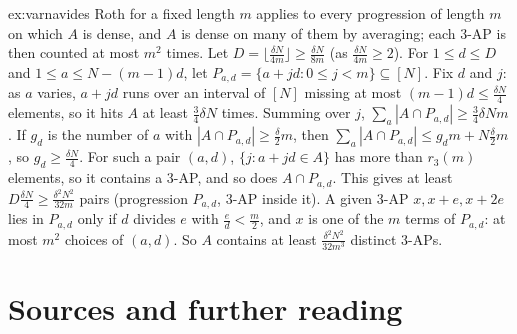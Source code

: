 \begin{solution}{ex:varnavides}
\idea Roth for a fixed length $m$ applies to every progression of length $m$ on which $A$ is dense, and $A$ is dense on many of them by averaging; each $3$-AP is then counted at most $m^2$ times.
\writeup Let $D=\lfloor\frac{\delta N}{4m}\rfloor\ge\frac{\delta N}{8m}$ (as $\frac{\delta N}{4m}\ge2$). For $1\le d\le D$ and $1\le a\le N-(m-1)d$, let $P_{a,d}=\{a+jd:0\le j<m\}\subseteq[N]$. Fix $d$ and $j$: as $a$ varies, $a+jd$ runs over an interval of $[N]$ missing at most $(m-1)d\le\frac{\delta N}4$ elements, so it hits $A$ at least $\frac34\delta N$ times. Summing over $j$, $\sum_a|A\cap P_{a,d}|\ge\frac34\delta Nm$. If $g_d$ is the number of $a$ with $|A\cap P_{a,d}|\ge\frac\delta2m$, then $\sum_a|A\cap P_{a,d}|\le g_dm+N\frac\delta2m$, so $g_d\ge\frac{\delta N}4$. For such a pair $(a,d)$, $\{j:a+jd\in A\}$ has more than $r_3(m)$ elements, so it contains a $3$-AP, and so does $A\cap P_{a,d}$. This gives at least $D\frac{\delta N}4\ge\frac{\delta^2N^2}{32m}$ pairs (progression $P_{a,d}$, $3$-AP inside it). A given $3$-AP $x,x+e,x+2e$ lies in $P_{a,d}$ only if $d$ divides $e$ with $\frac ed<\frac m2$, and $x$ is one of the $m$ terms of $P_{a,d}$: at most $m^2$ choices of $(a,d)$. So $A$ contains at least $\frac{\delta^2N^2}{32m^3}$ distinct $3$-APs.
\end{solution}

\section*{Sources and further reading}

